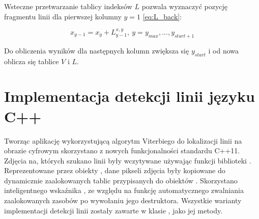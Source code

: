 \documentclass[document.tex]{subfiles}
\begin{document}
Wsteczne przetwarzanie tablicy indeksów $L$ pozwala wyznaczyć pozycję fragmentu linii dla pierwszej kolumny $y = 1$ \ref{eq:L_back}:

\begin{equation}
   x_{y-1} = x_y + L_{y-1}^{x,y},\ y = y_{max},...,y_{start + 1}
    \label{eq:L_back}
\end{equation}

Do obliczenia wyników dla następnych kolumn zwiększa się $y_{start}$ i od nowa oblicza się tablice $V$ i $L$.

\section{Implementacja detekcji linii języku C++}
\indent Tworząc aplikację wykorzystującą algorytm Viterbiego do lokalizacji linii
na obrazie cyfrowym skorzystano z nowych funkcjonalności standardu C++11. 
Zdjęcia na, których szukano linii były wczytywane używając funkcji biblioteki
\cite{cimg_doc}. Reprezentowane przez obiekty , dane pikseli zdjęcia były kopiowane do
dynamicznie zaalokowanych tablic przypisanych do obiektów . Skorzystano inteligentnego wskaźnika  , ze względu na funkcję automatycznego zwalniania zaalokowanych zasobów po wywołaniu jego destruktora.  
Wszystkie warianty implementacji detekcji linii zostały zawarte w klasie , 
jako jej metody. 

\end{document}
